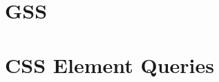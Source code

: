 \documentclass[a4paper,11pt]{kth-mag}
\begin{document}
    \section{GSS}
    \section{CSS Element Queries}
\end{document}
